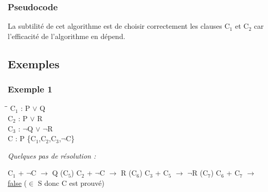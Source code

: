 \subsubsection{Pseudocode}

\begin{algorithm}[H]
\end{algorithm}


La subtilité de cet algorithme est de choisir correctement les clauses C$_{1}$ et C$_{2}$ car l'efficacité de l'algorithme en dépend. 

\subsection{Exemples}

\subsubsection{Exemple 1}
\begin{tabbing}
\hspace{3cm}\=\hspace{2cm}\=\kill
C$_{1}$ : P $\lor$ Q \\
C$_{2}$ : P $\lor$ R \\
C$_{3}$ : $\lnot$Q $\lor$ $\lnot$R \\
C : P \> \> \{C$_{1}$,C$_{2}$,C$_{3}$,$\lnot$C\} \\
\end{tabbing}

\noindent \emph{Quelques pas de résolution :}

\noindent C$_{1}$ + $\lnot$C $\rightarrow$  Q (C$_{5}$) \newline
C$_{2}$ + $\lnot$C $\rightarrow$ R  (C$_{6}$) \newline
C$_{3}$ + C$_{5}$ $\rightarrow$ $\lnot$R (C$_{7}$) \newline 
C$_{6}$ + C$_{7}$ $\rightarrow$ \underline{false} ($\in$ S donc C est prouvé) \newline

